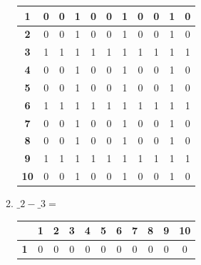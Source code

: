 \documentclass[a4paper,14pt]{extarticle}
\begin{document}
\begin{enumerate}[label=1.\arabic*.]
\begin{enumerate}[1) ]
\begin{tabular}{|c|c|c|c|c|c|c|c|c|c|c|}
			            \hline\textbf{1}  & 0          & 0          & 1          & 0          & 0          & 1          & 0          & 0          & 1          & 0           \\
			            \hline\textbf{2}  & 0          & 0          & 1          & 0          & 0          & 1          & 0          & 0          & 1          & 0           \\
			            \hline\textbf{3}  & 1          & 1          & 1          & 1          & 1          & 1          & 1          & 1          & 1          & 1           \\
			            \hline\textbf{4}  & 0          & 0          & 1          & 0          & 0          & 1          & 0          & 0          & 1          & 0           \\
			            \hline\textbf{5}  & 0          & 0          & 1          & 0          & 0          & 1          & 0          & 0          & 1          & 0           \\
			            \hline\textbf{6}  & 1          & 1          & 1          & 1          & 1          & 1          & 1          & 1          & 1          & 1           \\
			            \hline\textbf{7}  & 0          & 0          & 1          & 0          & 0          & 1          & 0          & 0          & 1          & 0           \\
			            \hline\textbf{8}  & 0          & 0          & 1          & 0          & 0          & 1          & 0          & 0          & 1          & 0           \\
			            \hline\textbf{9}  & 1          & 1          & 1          & 1          & 1          & 1          & 1          & 1          & 1          & 1           \\
			            \hline\textbf{10} & 0          & 0          & 1          & 0          & 0          & 1          & 0          & 0          & 1          & 0           \\
			            \hline
		            \end{tabular}
		      \item $\_2 - \_3 = $  \begin{tabular}{|c|c|c|c|c|c|c|c|c|c|c|}
			            \hline
			                              & \textbf{1} & \textbf{2} & \textbf{3} & \textbf{4} & \textbf{5} & \textbf{6} & \textbf{7} & \textbf{8} & \textbf{9} & \textbf{10} \\
			            \hline\textbf{1}  & 0          & 0          & 0          & 0          & 0          & 0          & 0          & 0          & 0          & 0           \\

\end{tabular}
\end{enumerate}
\end{enumerate}
\end{document}

